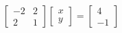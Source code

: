 \documentclass[preview]{standalone}
\begin{document}
\begin{center}
$\begin{bmatrix} -2 & 2 \\ 2 & 1 \end{bmatrix}$$\begin{bmatrix} x \\ y \end{bmatrix} = $$\begin{bmatrix} 4 \\ -1 \end{bmatrix}$
\end{center}
\end{document}
